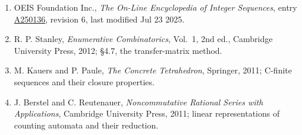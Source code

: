 \documentclass[11pt]{article}
\theoremstyle{definition}
\begin{document}
\begin{enumerate}

\item OEIS Foundation Inc., \emph{The On-Line Encyclopedia of Integer Sequences}, entry \href{https://oeis.org/A250136}{A250136}, revision 6, last modified Jul 23 2025.

\item R. P. Stanley, \emph{Enumerative Combinatorics}, Vol.~1, 2nd ed., Cambridge University Press, 2012; \S4.7, the transfer-matrix method.

\item M. Kauers and P. Paule, \emph{The Concrete Tetrahedron}, Springer, 2011; C-finite sequences and their closure properties.

\item J. Berstel and C. Reutenauer, \emph{Noncommutative Rational Series with Applications}, Cambridge University Press, 2011; linear representations of counting automata and their reduction.

\end{enumerate}
\end{document}
